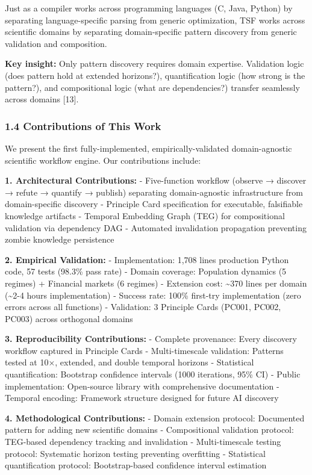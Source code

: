 \documentclass[
]{article}
\begin{document}
Just as a compiler works across programming languages (C, Java, Python)
by separating language-specific parsing from generic optimization, TSF
works across scientific domains by separating domain-specific pattern
discovery from generic validation and composition.

\textbf{Key insight:} Only pattern discovery requires domain expertise.
Validation logic (does pattern hold at extended horizons?),
quantification logic (how strong is the pattern?), and compositional
logic (what are dependencies?) transfer seamlessly across domains
{[}13{]}.

\subsubsection{1.4 Contributions of This
Work}\label{contributions-of-this-work}

We present the first fully-implemented, empirically-validated
domain-agnostic scientific workflow engine. Our contributions include:

\textbf{1. Architectural Contributions:} - Five-function workflow
(observe → discover → refute → quantify → publish) separating
domain-agnostic infrastructure from domain-specific discovery -
Principle Card specification for executable, falsifiable knowledge
artifacts - Temporal Embedding Graph (TEG) for compositional validation
via dependency DAG - Automated invalidation propagation preventing
zombie knowledge persistence

\textbf{2. Empirical Validation:} - Implementation: 1,708 lines
production Python code, 57 tests (98.3\% pass rate) - Domain coverage:
Population dynamics (5 regimes) + Financial markets (6 regimes) -
Extension cost: \textasciitilde370 lines per domain (\textasciitilde2-4
hours implementation) - Success rate: 100\% first-try implementation
(zero errors across all functions) - Validation: 3 Principle Cards
(PC001, PC002, PC003) across orthogonal domains

\textbf{3. Reproducibility Contributions:} - Complete provenance: Every
discovery workflow captured in Principle Cards - Multi-timescale
validation: Patterns tested at 10×, extended, and double temporal
horizons - Statistical quantification: Bootstrap confidence intervals
(1000 iterations, 95\% CI) - Public implementation: Open-source library
with comprehensive documentation - Temporal encoding: Framework
structure designed for future AI discovery

\textbf{4. Methodological Contributions:} - Domain extension protocol:
Documented pattern for adding new scientific domains - Compositional
validation protocol: TEG-based dependency tracking and invalidation -
Multi-timescale testing protocol: Systematic horizon testing preventing
overfitting - Statistical quantification protocol: Bootstrap-based
confidence interval estimation
\end{document}
